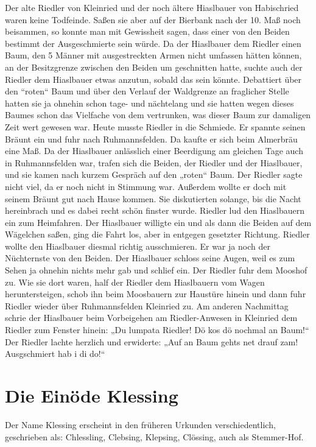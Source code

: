 \documentclass[12pt,a4pager]{book}
\begin{document}
Der alte Riedler von Kleinried und der noch ältere Hiaslbauer von Habischried
waren keine Todfeinde. Saßen sie aber auf der Bierbank nach der 10. Maß noch
beisammen, so konnte man mit Gewissheit sagen, dass einer von den Beiden
bestimmt der Ausgeschmierte sein würde. Da der Hiaslbauer dem Riedler einen
Baum, den 5 Männer mit ausgestreckten Armen nicht umfassen hätten können, an der
Besitzgrenze zwischen den Beiden um geschnitten hatte, suchte auch der Riedler
dem Hiaslbauer etwas anzutun, sobald das sein könnte. Debattiert über den
“roten“ Baum und über den Verlauf der Waldgrenze an fraglicher Stelle hatten sie
ja ohnehin schon tage- und nächtelang und sie hatten wegen dieses Baumes schon
das Vielfache von dem vertrunken, was dieser Baum zur damaligen Zeit wert
gewesen war. Heute musste Riedler in die Schmiede. Er spannte seinen Bräunt ein
und fuhr nach Ruhmannsfelden. Da kaufte er sich beim Almerbräu eine Maß. Da der
Hiaslbauer anlässlich einer Beerdigung am gleichen Tage auch in Ruhmannsfelden
war, trafen sich die Beiden, der Riedler und der Hiaslbauer, und sie kamen nach
kurzem Gespräch auf den „roten“ Baum. Der Riedler sagte nicht viel, da er noch
nicht in Stimmung war. Außerdem wollte er doch mit seinem Bräunt gut nach Hause
kommen. Sie diskutierten solange, bis die Nacht hereinbrach und es dabei recht
schön finster wurde. Riedler lud den Hiaslbauern ein zum Heimfahren. Der
Hiaslbauer willigte ein und als dann die Beiden auf dem Wägelchen saßen, ging
die Fahrt los, aber in entgegen gesetzter Richtung. Riedler wollte den
Hiaslbauer diesmal richtig ausschmieren. Er war ja noch der Nüchternste von den
Beiden. Der Hiaslbauer schloss seine Augen, weil es zum Sehen ja ohnehin nichts
mehr gab und schlief ein. Der Riedler fuhr dem Mooshof zu. Wie sie dort waren,
half der Riedler dem Hiaslbauern vom Wagen heruntersteigen, schob ihn beim
Moosbauern zur Haustüre hinein und dann fuhr Riedler wieder über Ruhmannsfelden
Kleinried zu. Am anderen Nachmittag schrie der Hiaslbauer beim Vorbeigehen am
Riedler-Anwesen in Kleinried dem Riedler zum Fenster hinein: „Du lumpata
Riedler! Dö kos dö nochmal an Baum!“ Der Riedler lachte herzlich und erwiderte:
„Auf an Baum gehts net drauf zam! Ausgschmiert hab i di do!“

\section{Die Einöde Klessing}

Der Name Klessing erscheint in den früheren Urkunden verschiedentlich,
geschrieben als: Chlessling, Clebsing, Klepsing, Clössing, auch als Stemmer-Hof.
\end{document}

